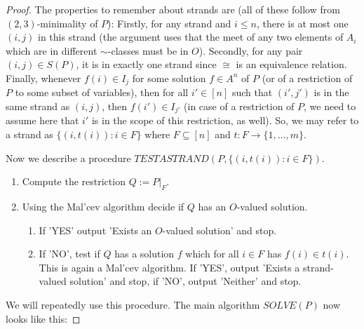 \documentclass[10pt,a4paper]{amsart}
\newcommand{\usub}{\subseteq}
\begin{document}
\begin{proof}
The properties to remember about strands are (all of these follow from $(2,3)$-minimality of $P$): Firstly, for any strand and $i\leq n$, there is at most one $(i,j)$ in this strand (the argument uses that the meet of any two elements of $A_i$ which are in different $\sim$-classes must be in $O$). Secondly, for any pair $(i,j)\in S(P)$, it is in exactly one strand since $\cong$ is an equivalence relation. Finally, whenever $f(i)\in I_j$ for some solution $f\in A^n$ of $P$ (or of a restriction of $P$ to some subset of variables), then for all $i'\in[n]$ such that $(i',j')$ is in the same strand as $(i,j)$, then $f(i')\in I_{j'}$ (in case of a restriction of $P$, we need to assume here that $i'$ is in the scope of this restriction, as well). So, we may refer to a strand as $\{(i,t(i)):i\in F\}$ where $F\usub [n]$ and $t:F\rightarrow \{1,\ldots,m\}$.

Now we describe a procedure $TESTASTRAND(P,\{(i,t(i)):i\in F\})$.

\begin{enumerate}
\item[{\bf Step 1.}] Compute the restriction $Q:=P|_F$.
\item[{\bf Step 2.}] Using the Mal'cev algorithm decide if $Q$ has an $O$-valued solution.
\begin{enumerate}
\item[{\bf Step 2.1.}] If 'YES' output 'Exists an $O$-valued solution' and stop.
\item[{\bf Step 2.2.}] If 'NO', test if $Q$ has a solution $f$ which for all $i\in F$ has $f(i)\in t(i)$. This is again a Mal'cev algorithm. If 'YES', output 'Exists a strand-valued solution' and stop, if 'NO', output 'Neither' and stop.
\end{enumerate}
\end{enumerate}

We will repeatedly use this procedure. The main algorithm $SOLVE(P)$ now looks like this:


\end{proof}
\end{document}
